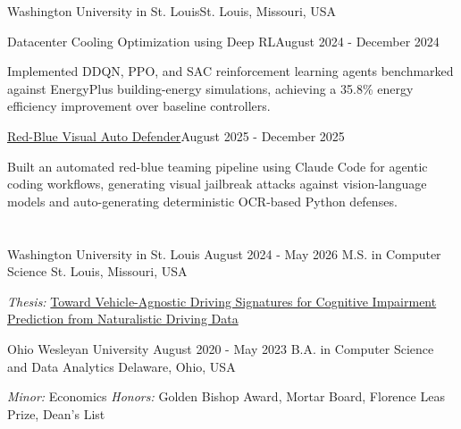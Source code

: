 \documentclass[10pt, letterpaper]{article}
\begin{document}
\vspace{\entrySpacing}
\begin{leadershipentry}{Washington University in St. Louis}{St. Louis, Missouri, USA}
	\begin{positionentry}{Datacenter Cooling Optimization using Deep RL}{August 2024 - December 2024}
		\item Implemented DDQN, PPO, and SAC reinforcement learning agents benchmarked against EnergyPlus building-energy simulations, achieving a 35.8\% energy efficiency improvement over baseline controllers.
	\end{positionentry}
	\begin{positionentry}{\href{https://github.com/agopalareddy/visual-jailbreak-defense}{Red-Blue Visual Auto Defender}}{August 2025 - December 2025}
		\item Built an automated red-blue teaming pipeline using Claude Code for agentic coding workflows, generating visual jailbreak attacks against vision-language models and auto-generating deterministic OCR-based Python defenses.
	\end{positionentry}
\end{leadershipentry}

\vspace{\headerSpacing}


\section{}

\vspace{\entrySpacing}
\begin{educationentry}
	{Washington University in St. Louis}
	{August 2024 - May 2026}
	{M.S. in Computer Science}
	{St. Louis, Missouri, USA}
\begin{highlightsforbulletentries}
\item \textit{Thesis:} \href{https://doi.org/10.7936/g95n-fv35}{Toward Vehicle-Agnostic Driving Signatures for Cognitive Impairment Prediction from Naturalistic Driving Data}
\end{highlightsforbulletentries}
\end{educationentry}

\vspace{\entrySpacing}
\begin{educationentry}
	{Ohio Wesleyan University}
	{August 2020 - May 2023}
	{B.A. in Computer Science and Data Analytics}
	{Delaware, Ohio, USA}
\begin{highlightsforbulletentries}
\item \textit{Minor:} Economics \textbar{} \textit{Honors:} Golden Bishop Award, Mortar Board, Florence Leas Prize, Dean's List
\end{highlightsforbulletentries}
\end{educationentry}

\end{document}
